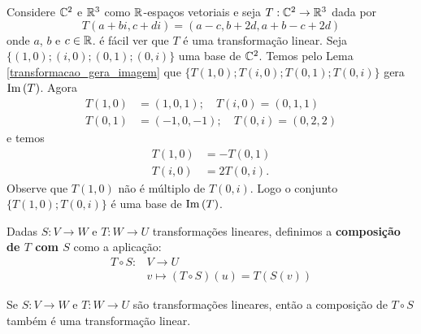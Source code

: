 \begin{exemplo}
  Considere $\mathbb{C}^2$ e $\mathbb{R}^3$ como $\mathbb{R}$-espaços vetoriais e seja $T : \mathbb{C}^2 \to \mathbb{R}^3$ dada por
  \[
    T(a+bi, c+di) = (a - c, b + 2d, a + b - c + 2d)
  \]
  onde $a$, $b$ e $c \in \mathbb{R}$. é fácil ver que $T$ é uma transformação linear. Seja $\{(1,0);(i,0);(0,1);(0,i)\}$ uma base de $\mathbb{C}^2$. Temos pelo Lema \ref{transformacao_gera_imagem} que $\{T(1,0);T(i,0);T(0,1);T(0,i)\}$ gera ${\rm Im\,}(T)$. Agora
  \begin{align*}
    T(1,0) &= (1,0,1);\quad T(i,0) = (0,1,1)\\
    T(0,1) &= (-1,0,-1);\quad T(0,i) = (0,2,2)
  \end{align*}
  e temos
  \begin{align*}
    T(1,0) &= -T(0,1)\\
    T(i,0) &= 2T(0,i).
  \end{align*}
  Observe que $T(1,0)$ não é múltiplo de $T(0,i)$. Logo o conjunto $\{T(1,0); T(0,i)\}$ é uma base de ${\rm Im\,}(T)$.
\end{exemplo}

\begin{definicao}
  Dadas $S \colon V \to W$  e $T \colon W \to U$ transformações lineares,  definimos a \textbf{composição de $T$ com $S$}  como a aplicação:
  \begin{align*}
    T \circ S \colon &V \to U\\
                     &v \mapsto (T\circ S)(u) = T(S(v))
  \end{align*}
\end{definicao}

\begin{proposicao}
  Se $S \colon V \to W$ e $T \colon W \to U$ são transformações lineares,  então a composição de $T\circ S$ também é uma transformação linear.
\end{proposicao}

